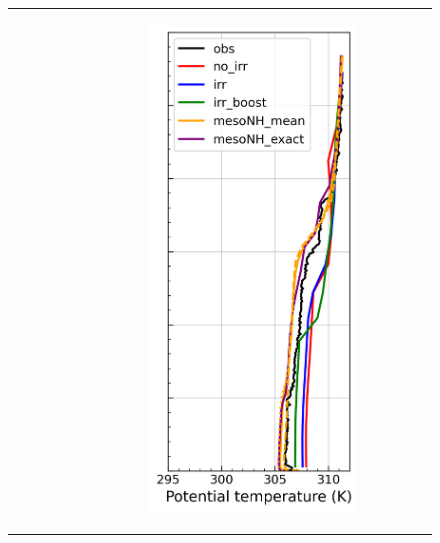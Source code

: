 \begin{figure}[hbtp]
{\begin{tabular}{@{}cccc@{}}
\begin{subfigure}[t]{0.29\textwidth}
        \end{subfigure} &
        \begin{subfigure}[t]{0.285\textwidth}
            \caption{}
            \includegraphics[width=\textwidth]{images/chap5/profiles/profile_cendrosa_theta_2007_sensbins.png}

\end{subfigure}
\end{tabular}}
\end{figure}
